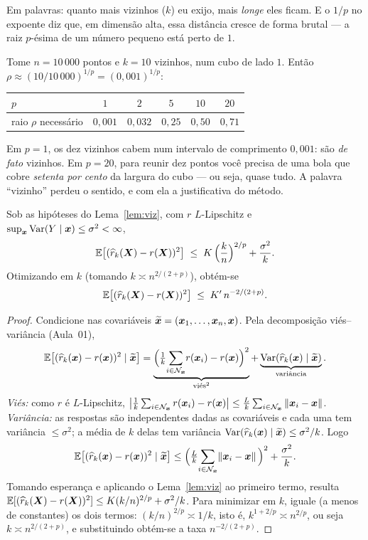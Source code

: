 \documentclass[11pt,a4paper]{article}
\begin{document}
\noindent
Em palavras: quanto mais vizinhos ($k$) eu exijo, mais \emph{longe} eles ficam. E o
$1/p$ no expoente diz que, em dimensão alta, essa distância cresce de forma
brutal --- a raiz $p$-ésima de um número pequeno está perto de $1$.

\begin{exemplo}
Tome $n=10\,000$ pontos e $k=10$ vizinhos, num cubo de lado $1$. Então
$\rho\approx (10/10\,000)^{1/p} = (0{,}001)^{1/p}$:
\begin{center}\small
\renewcommand{\arraystretch}{1.2}
\begin{tabular}{@{}lccccc@{}}
\toprule
$p$ & $1$ & $2$ & $5$ & $10$ & $20$ \\
\midrule
raio $\rho$ necessário & $0{,}001$ & $0{,}032$ & $0{,}25$ & $0{,}50$ & $0{,}71$ \\
\bottomrule
\end{tabular}
\end{center}
Em $p=1$, os dez vizinhos cabem num intervalo de comprimento $0{,}001$: são
\emph{de fato} vizinhos. Em $p=20$, para reunir dez pontos você precisa de uma bola
que cobre \emph{setenta por cento} da largura do cubo --- ou seja, quase tudo. A
palavra ``vizinho'' perdeu o sentido, e com ela a justificativa do método.
\end{exemplo}

\begin{teorema}\label{teo:knn}
Sob as hipóteses do Lema~\ref{lem:viz}, com $r$ $L$-Lipschitz e
$\sup_{\bm{x}}\operatorname{Var}(Y\mid\bm{x})\le\sigma^2<\infty$,
\[
  \mathbb{E}\big[(\widehat{r}_k(\bm{X})-r(\bm{X}))^2\big]
   \;\le\; K\,\Big(\frac{k}{n}\Big)^{2/p} + \frac{\sigma^2}{k}.
\]
Otimizando em $k$ (tomando $k \asymp n^{2/(2+p)}$), obtém-se
\[
  \mathbb{E}\big[(\widehat{r}_k(\bm{X})-r(\bm{X}))^2\big] \;\le\; K'\, n^{-2/(2+p)}.
\]
\end{teorema}
\begin{proof}
Condicione nas covariáveis $\widetilde{\bm{x}}=(\bm{x}_1,\dots,\bm{x}_n,\bm{x})$. Pela decomposição
viés--variância (Aula~01),
\[
  \mathbb{E}\big[(\widehat{r}_k(\bm{x})-r(\bm{x}))^2\mid\widetilde{\bm{x}}\big]
  = \underbrace{\Big(\tfrac1k\!\sum_{i\in\mathcal{N}_{\bm{x}}}\! r(\bm{x}_i)-r(\bm{x})\Big)^2}_{\text{viés}^2}
  + \underbrace{\operatorname{Var}(\widehat{r}_k(\bm{x})\mid\widetilde{\bm{x}})}_{\text{variância}}.
\]
\emph{Viés:} como $r$ é $L$-Lipschitz,
$\big|\tfrac1k\sum_{i\in\mathcal{N}_{\bm{x}}}r(\bm{x}_i)-r(\bm{x})\big|
\le \tfrac{L}{k}\sum_{i\in\mathcal{N}_{\bm{x}}}\left\lVert \bm{x}_i-\bm{x} \right\rVert$.
\emph{Variância:} as respostas são independentes dadas as covariáveis e cada uma
tem variância $\le\sigma^2$; a média de $k$ delas tem variância
$\operatorname{Var}(\widehat{r}_k(\bm{x})\mid\widetilde{\bm{x}})\le \sigma^2/k$. Logo
\[
  \mathbb{E}\big[(\widehat{r}_k(\bm{x})-r(\bm{x}))^2\mid\widetilde{\bm{x}}\big]
  \le \Big(\tfrac{L}{k}\!\sum_{i\in\mathcal{N}_{\bm{x}}}\!\left\lVert \bm{x}_i-\bm{x} \right\rVert\Big)^2 + \frac{\sigma^2}{k}.
\]
Tomando esperança e aplicando o Lema~\ref{lem:viz} ao primeiro termo, resulta
$\mathbb{E}[(\widehat{r}_k(\bm{X})-r(\bm{X}))^2]\le K(k/n)^{2/p}+\sigma^2/k$. Para minimizar em $k$,
iguale (a menos de constantes) os dois termos: $(k/n)^{2/p}\asymp 1/k$, isto é,
$k^{1+2/p}\asymp n^{2/p}$, ou seja $k\asymp n^{2/(2+p)}$, e substituindo obtém-se
a taxa $n^{-2/(2+p)}$.
\end{proof}
\end{document}
